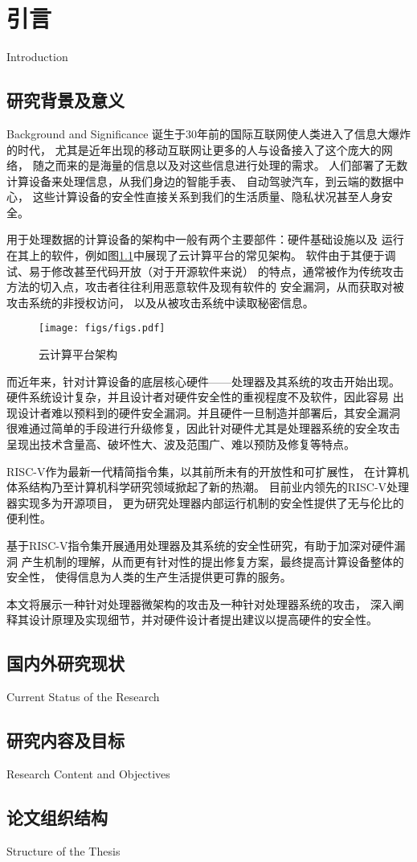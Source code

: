 
\chapter{引言}{Introduction}


\section{研究背景及意义}{Background and Significance}
诞生于30年前的国际互联网使人类进入了信息大爆炸的时代，
尤其是近年出现的移动互联网让更多的人与设备接入了这个庞大的网络，
随之而来的是海量的信息以及对这些信息进行处理的需求。
人们部署了无数计算设备来处理信息，从我们身边的智能手表、
自动驾驶汽车，到云端的数据中心，
这些计算设备的安全性直接关系到我们的生活质量、隐私状况甚至人身安全。

用于处理数据的计算设备的架构中一般有两个主要部件：硬件基础设施以及
运行在其上的软件，例如图\ref{fig:cloud-arch}中展现了云计算平台的常见架构。
软件由于其便于调试、易于修改甚至代码开放（对于开源软件来说）
的特点，通常被作为传统攻击方法的切入点，攻击者往往利用恶意软件及现有软件的
安全漏洞，从而获取对被攻击系统的非授权访问，
以及从被攻击系统中读取秘密信息。\cite{sw_attack}

\begin{figure}[ht]
	\centering
	\texttt{[image: figs/figs.pdf]}
	\caption{云计算平台架构}
	\label{fig:cloud-arch}
\end{figure}

而近年来，针对计算设备的底层核心硬件——处理器及其系统的攻击开始出现。
硬件系统设计复杂，并且设计者对硬件安全性的重视程度不及软件，因此容易
出现设计者难以预料到的硬件安全漏洞。并且硬件一旦制造并部署后，其安全漏洞
很难通过简单的手段进行升级修复，因此针对硬件尤其是处理器系统的安全攻击
呈现出技术含量高、破坏性大、波及范围广、难以预防及修复等特点。

RISC-V作为最新一代精简指令集，以其前所未有的开放性和可扩展性，
在计算机体系结构乃至计算机科学研究领域掀起了新的热潮。
目前业内领先的RISC-V处理器实现多为开源项目，
更为研究处理器内部运行机制的安全性提供了无与伦比的便利性。

基于RISC-V指令集开展通用处理器及其系统的安全性研究，有助于加深对硬件漏洞
产生机制的理解，从而更有针对性的提出修复方案，最终提高计算设备整体的安全性，
使得信息为人类的生产生活提供更可靠的服务。

本文将展示一种针对处理器微架构的攻击及一种针对处理器系统的攻击，
深入阐释其设计原理及实现细节，并对硬件设计者提出建议以提高硬件的安全性。

\section{国内外研究现状}{Current Status of the Research}
\somewords


\section{研究内容及目标}{Research Content and Objectives}
\somewords


\section{论文组织结构}{Structure of the Thesis}
\somewords


\newpage
